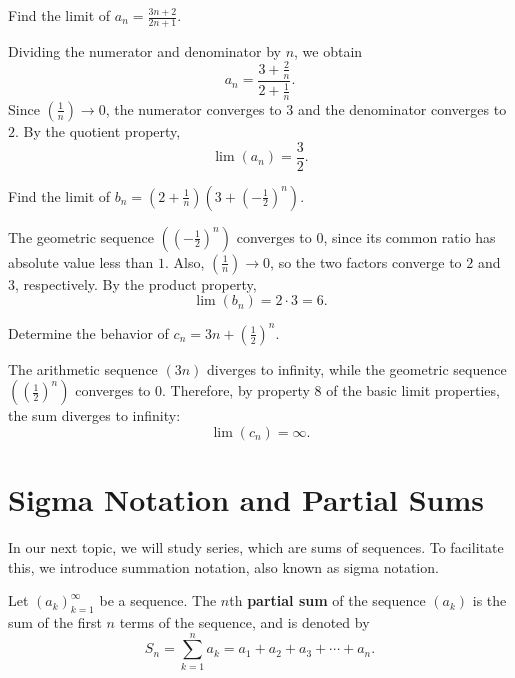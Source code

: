 \documentclass{article}
\begin{document}
\begin{example}\label{ex:limit-properties-rational}
Find the limit of \(a_n = \frac{3n+2}{2n+1}\).

Dividing the numerator and denominator by \(n\), we obtain
\[a_n = \frac{3+\frac{2}{n}}{2+\frac{1}{n}}.\]
Since \(\left(\frac{1}{n}\right) \to 0\), the numerator converges to \(3\) and the denominator converges to \(2\). By the quotient property,
\[\lim(a_n) = \frac{3}{2}.\]
\end{example}

\begin{example}\label{ex:limit-properties-geometric}
Find the limit of \(b_n = \left(2+\frac{1}{n}\right)\left(3+\left(-\frac{1}{2}\right)^n\right)\).

The geometric sequence \(\left(\left(-\frac{1}{2}\right)^n\right)\) converges to \(0\), since its common ratio has absolute value less than \(1\). Also, \(\left(\frac{1}{n}\right) \to 0\), so the two factors converge to \(2\) and \(3\), respectively. By the product property,
\[\lim(b_n) = 2 \cdot 3 = 6.\]
\end{example}

\begin{example}\label{ex:limit-properties-infinity}
Determine the behavior of \(c_n = 3n + \left(\frac{1}{2}\right)^n\).

The arithmetic sequence \((3n)\) diverges to infinity, while the geometric sequence \(\left(\left(\frac{1}{2}\right)^n\right)\) converges to \(0\). Therefore, by property 8 of the basic limit properties, the sum diverges to infinity:
\[\lim(c_n) = \infty.\]
\end{example}

\section{Sigma Notation and Partial Sums}\label{sec:sigma-notation}

In our next topic, we will study series, which are sums of sequences. To facilitate this, we introduce summation notation, also known as sigma notation.

\begin{definition}\label{def:sigma-notation}
Let \((a_k)_{k=1}^\infty\) be a sequence. The \(n\)th \textbf{partial sum} of the sequence \((a_k)\) is the sum of the first \(n\) terms of the sequence, and is denoted by
\[S_n = \sum_{k=1}^{n} a_k = a_1 + a_2 + a_3 + \cdots + a_n.\]
\end{definition}

\end{document}
